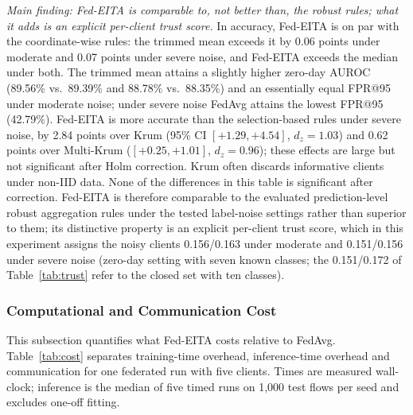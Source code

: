 \documentclass[pdflatex,sn-mathphys-num]{sn-jnl}
\newcommand{\Rtwo}{\color{blue}}
\begin{document}
{{{\emph{Main finding: Fed-EITA is comparable to, not better than, the robust rules; what it adds is an explicit per-client trust score.} In accuracy, Fed-EITA is on par with the coordinate-wise rules: the trimmed mean exceeds it by 0.06 points under moderate and 0.07 points under severe noise, and Fed-EITA exceeds the median under both. The trimmed mean attains a slightly higher zero-day AUROC (89.56\% vs.\ 89.39\% and 88.78\% vs.\ 88.35\%) and an essentially equal FPR@95 under moderate noise; under severe noise FedAvg attains the lowest FPR@95 (42.79\%). Fed-EITA is more accurate than the selection-based rules under severe noise, by 2.84 points over Krum (95\% CI $[+1.29,+4.54]$, $d_z=1.03$) and 0.62 points over Multi-Krum ($[+0.25,+1.01]$, $d_z=0.96$); these effects are large but not significant after Holm correction. Krum often discards informative clients under non-IID data. None of the differences in this table is significant after correction. Fed-EITA is therefore comparable to the evaluated prediction-level robust aggregation rules under the tested label-noise settings rather than superior to them; its distinctive property is an explicit per-client trust score, which in this experiment assigns the noisy clients 0.156/0.163 under moderate and 0.151/0.156 under severe noise {\Rtwo (zero-day setting with seven known classes; the 0.151/0.172 of Table~\ref{tab:trust} refer to the closed set with ten classes)}.}
{\color{black}
\subsubsection{Computational and Communication Cost}\label{sec:cost}
This subsection quantifies what Fed-EITA costs relative to FedAvg. Table~\ref{tab:cost} separates training-time overhead, inference-time overhead and communication for one federated run with five clients. Times are measured wall-clock; inference is the median of five timed runs on 1{,}000 test flows per seed and excludes one-off fitting.

}}}
\end{document}
